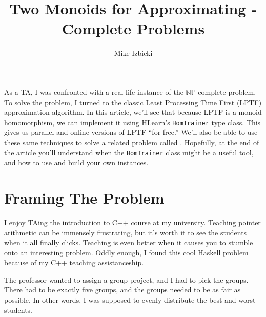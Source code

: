 \documentclass[tikz]{tmr}
\title{Two Monoids for Approximating \np-Complete Problems}
\author{Mike Izbicki\email{mike@izbicki.me}}
\newcommand\h{\lstinline}
\newcommand{\prob}[1]{{\sc {#1}}}
\newcommand{\np}{{\ensuremath{\mathbb{NP}}}}
\newcommand\+{\mdoubleplus}
\begin{document}
\begin{introduction}
As a TA, I was confronted with a real life instance of the \np-complete \prob{Scheduling} problem.
To solve the problem, I turned to the classic Least Processing Time First (LPTF) approximation algorithm.
In this article, we'll see that because LPTF is a monoid homomorphism, we can implement it using HLearn's {\upshape\h{HomTrainer}} type class.
This gives us parallel and online versions of LPTF ``for free.''
We'll also be able to use these same techniques to solve a related problem called \prob{BinPacking}.
Hopefully, at the end of the article you'll understand when the {\upshape\h{HomTrainer}} class might be a useful tool, and how to use and build your own instances.
\end{introduction}

\section{Framing The Problem}
I enjoy TAing the introduction to C++ course at my university.
Teaching pointer arithmetic can be immensely frustrating, but it's worth it to see the students when it all finally clicks.  
Teaching is even better when it causes you to stumble onto an interesting problem.  
Oddly enough, I found this cool Haskell problem because of my C++ teaching assistanceship.

The professor wanted to assign a group project, and I had to pick the groups.
There had to be exactly five groups, and the groups needed to be as fair as possible.
In other words, I was supposed to evenly distribute the best and worst students.
\end{document}
